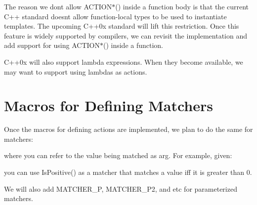 The reason we don\textquotesingle{}t allow {\ttfamily A\+C\+T\+I\+O\+N$\ast$()} inside a function body is that the current C++ standard doesn\textquotesingle{}t allow function-\/local types to be used to instantiate templates. The upcoming C++0x standard will lift this restriction. Once this feature is widely supported by compilers, we can revisit the implementation and add support for using {\ttfamily A\+C\+T\+I\+O\+N$\ast$()} inside a function.

C++0x will also support lambda expressions. When they become available, we may want to support using lambdas as actions.

\section*{Macros for Defining Matchers}

Once the macros for defining actions are implemented, we plan to do the same for matchers\+:


\begin{DoxyCode}{0}
\end{DoxyCode}


where you can refer to the value being matched as {\ttfamily arg}. For example, given\+:


\begin{DoxyCode}{0}
\end{DoxyCode}


you can use {\ttfamily Is\+Positive()} as a matcher that matches a value iff it is greater than 0.

We will also add {\ttfamily M\+A\+T\+C\+H\+E\+R\+\_\+P}, {\ttfamily M\+A\+T\+C\+H\+E\+R\+\_\+\+P2}, and etc for parameterized matchers. 